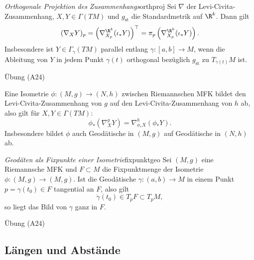 \begin{satz}{\textit{Orthogonale Projektion des Zusammenhangs}}{orthproj}
Sei $\nabla$ der Levi-Civita-Zusammenhang, $X, Y \in \Gamma(TM)$ und $g_\text{st}$ die Standardmetrik auf $\R^k$. Dann gilt
\begin{equation}
(\nabla_XY)_p = \left( \nabla_{X_p}^{\R^k}(\iota_\ast Y) \right)^{\top} = \pi_p \left( \nabla_{X_p}^{\R^k}(\iota_\ast Y) \right).
\end{equation}
Insbesondere ist $Y \in \Gamma_\gamma (TM)$ parallel entlang $\gamma: [a,b] \to M$, wenn die Ableitung von $Y$ in jedem Punkt $\gamma (t)$ orthogonal bezüglich $g_\text{st}$ zu $T_{\gamma(t)}M$ ist.
\end{satz}
\begin{beweis}
Übung (A24)
\end{beweis}
Eine Isometrie $\phi: (M,g) \to (N,h)$ zwischen Riemannschen MFK bildet den Levi-Civita-Zusammenhang von $g$ auf den Levi-Civita-Zusammenhang von $h$ ab, also gilt für $X,Y \in \Gamma(TM)$:
\begin{equation}
\phi_\ast (\nabla_X^g Y)=\nabla^h_{\phi_\ast X} (\phi_\ast Y).
\end{equation}
Insbesondere bildet $\phi$ auch Geodätische in $(M,g)$ auf Geodätische in $(N,h)$ ab.
\begin{satz}{\textit{Geodäten als Fixpunkte einer Isometrie}}{fixpunktgeo}
Sei $(M,g)$ eine Riemannsche MFK und $F \subset M$ die Fixpunktmenge der Isometrie $\phi: (M,g) \to (M,g)$. Ist die Geodätische $\gamma: (a,b) \to M$ in einem Punkt $p = \gamma(t_0)\in F$ tangential an $F$, also gilt
\begin{equation}
\dot{\gamma}(t_0) \in T_pF \subset T_pM,
\end{equation}
so liegt das Bild von $\gamma$ ganz in $F$.
\end{satz}
\begin{beweis}
Übung (A24)
\end{beweis}
\subsection{Längen und Abstände}
\label{subsec:laengenundabstaende}

